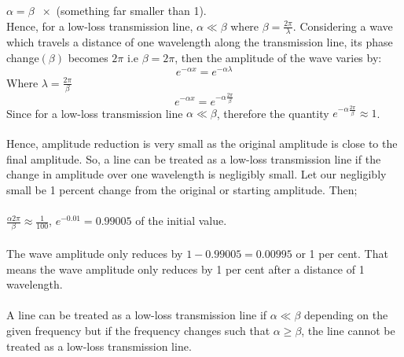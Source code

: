 $\alpha = \beta \;\; \times$ (something far smaller than 1).\\
Hence, for a low-loss transmission line, $\alpha \ll \beta$ where $\beta = \frac{2 \pi}{\lambda}$.
Considering a wave which travels a distance of one wavelength along the transmission line, its phase change$(\beta)$ becomes $2\pi$ i.e $\beta= 2 \pi$, then the amplitude of the wave varies by:
\begin{equation*}
e^{-\alpha x} = e^{-\alpha \lambda}	
\end{equation*}
Where $\lambda = \frac{2 \pi}{\beta}$
\begin{equation*}
e^{- \alpha x} = e^{-\alpha \frac{2 \pi}{\beta}}
\end{equation*}
Since for a low-loss transmission line $\alpha\ll\beta$, therefore the quantity $e^{-\alpha \frac{2 \pi}{\beta}} \approx 1$.\\\\
Hence, amplitude reduction is very small as the original amplitude is close to the final amplitude. So, a line can be treated as a low-loss transmission line if the change in amplitude over one wavelength is negligibly small. Let our negligibly small be 1 percent change from the original or starting amplitude. Then;\\\\ 
$\frac{\alpha 2 \pi}{\beta} \approx \frac{1}{100}$, $ e^{-0.01} = 0.99005$ of the initial value.\\\\
The wave amplitude only reduces by $1-0.99005=0.00995$ or 1 per cent. That means the wave amplitude only reduces by 1 per cent after a distance of 1 wavelength.\\\\
A line can be treated as a low-loss transmission line if $\alpha \ll \beta$ depending on the given frequency but if the frequency changes such that $\alpha \geq \beta$, the line cannot be treated as a low-loss transmission line.\\

